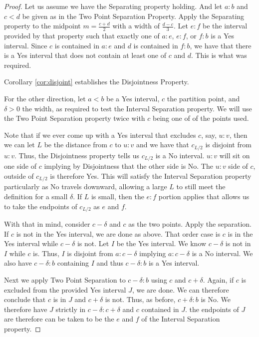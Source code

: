\documentclass[12pt]{article}
\begin{document}
\begin{proof}
    Let us assume we have the Separating property holding. And let $a:b$ and $c < d$ be given as in the Two Point Separation Property. Apply the Separating property to the midpoint $m =\frac{c+d}{2}$ with a width of $\frac{d-c}{3}$. Let $e:f$ be the interval provided by that property such that exactly one of $a:e$, $e:f$, or $f:b$ is a Yes interval. Since $c$ is contained in $a:e$ and $d$ is contained in $f:b$, we have that there is a Yes interval that does not contain at least one of $c$ and $d$. This is what was required. 
    
    Corollary \ref{cor:disjoint} establishes the Disjointness Property. 

    For the other direction, let $a < b$ be a Yes interval, $c$ the partition point, and $\delta >0$ the width, as required to test the Interval Separation property. We will use the Two Point Separation property twice with $c$ being one of of the points used. 
    
    Note that if we ever come up with a Yes interval that excludes $c$, say, $u:v$, then we can let $L$ be the distance from $c$ to $u:v$ and we have that $c_{L/2}$ is disjoint from $u:v$. Thus, the Disjointness property tells us $c_{L/2}$ is a No interval. $u:v$ will sit on one side of $c$ implying by Disjointness that the other side is No. The $u:v$ side of $c$, outside of $c_{L/2}$ is therefore Yes. This will satisfy the Interval Separation property particularly as No travels downward, allowing a large $L$ to still meet the definition for a small $\delta$. If $L$ is small, then the $e:f$ portion applies that allows us to take the endpoints of $c_{L/2}$ as $e$ and $f$.
    
    With that in mind, consider $c-\delta$ and $c$ as the two points. Apply the separation. If $c$ is not in the Yes interval, we are done as above. That order case is $c$ is in the Yes interval while $c-\delta$ is not. Let $I$ be the Yes interval. We know $c-\delta$ is not in $I$ while $c$ is. Thus, $I$ is disjoint from $a:c-\delta$ implying $a:c-\delta$ is a No interval. We also have $c-\delta:b$ containing $I$ and thus $c-\delta:b$ is a Yes interval. 

    Next we apply Two Point Separation to $c-\delta:b$ using $c$ and $c+\delta$. Again, if $c$ is excluded from the provided Yes interval $J$, we are done. We can therefore conclude that $c$ is in $J$ and $c+\delta$ is not. Thus, as before, $c+\delta:b$ is No. We therefore have $J$ strictly in $c-\delta:c+\delta$ and $c$ contained in $J$. the endpoints of $J$ are therefore can be taken to be the $e$ and $f$ of the Interval Separation property. 
    
\end{proof}
\end{document}
